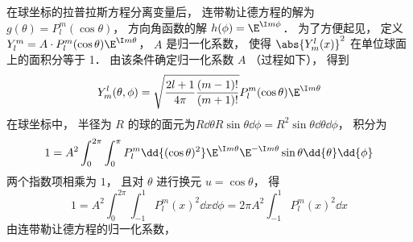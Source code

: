 

在球坐标的拉普拉斯方程分离变量后， 连带勒让德方程的解为 $g(\theta) = P_l^m(\cos\theta)$， 方向角函数的解 $h(\phi) = \E^{\I m\phi}$． 为了方便起见， 定义 $Y_l^m = A \cdot P_l^m(\cos \theta) \E^{\I m\theta}$， $A$ 是归一化系数， 使得 $\abs{Y_m^l (x)}^2$ 在单位球面上的面积分等于 1． 由该条件确定归一化系数 $A$ （过程如下）， 得到
\begin{equation}
Y_m^l (\theta ,\phi) = \sqrt{\frac{2l + 1}{4\pi }\frac{(m - 1)!}{(m + 1)!}} P_l^m (\cos\theta) \E^{\I m\theta}
\end{equation}
在球坐标中， 半径为 $R$ 的球的面元为$R \dd{\theta} R\sin\theta \dd{\phi} = R^2 \sin\theta \dd{\theta} \dd{\phi}$，  积分为
\begin{equation}
1 = A^2\int_0^{2\pi } \int_0^\pi  P_l^m \dd{(\cos \theta)^2} \E^{\I m\theta} \E^{-\I m\theta}\sin\theta \dd{\theta} \dd{\phi}
\end{equation}
两个指数项相乘为 $1$，  且对 $\theta$ 进行换元 $u = \cos\theta $， 得
\begin{equation}
1 = A^2 \int_0^{2\pi} \int_{-1}^1 P_l^m {{(x)}^2} \dd{x} \dd{\phi} = 2\pi A^2 \int_{-1}^1 P_l^m (x)^2 \dd{x} 
\end{equation}
由连带勒让德方程的归一化系数， %

